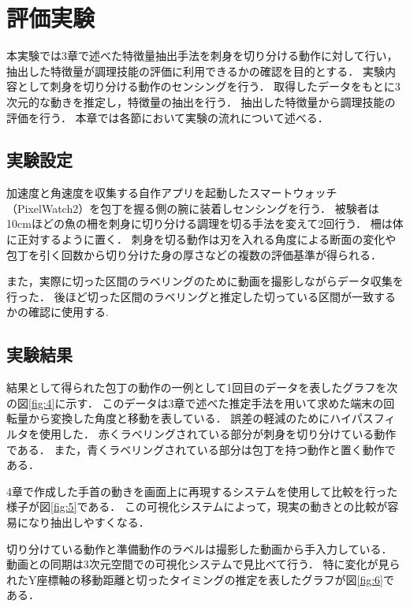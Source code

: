 \chapter{評価実験}
本実験では3章で述べた特徴量抽出手法を刺身を切り分ける動作に対して行い，抽出した特徴量が調理技能の評価に利用できるかの確認を目的とする．
実験内容として刺身を切り分ける動作のセンシングを行う．
取得したデータをもとに3次元的な動きを推定し，特徴量の抽出を行う．
抽出した特徴量から調理技能の評価を行う．
本章では各節において実験の流れについて述べる．
\section{実験設定}
加速度と角速度を収集する自作アプリを起動したスマートウォッチ（PixelWatch2）を包丁を握る側の腕に装着しセンシングを行う．
被験者は10cmほどの魚の柵を刺身に切り分ける調理を切る手法を変えて2回行う．
柵は体に正対するように置く．
刺身を切る動作は刃を入れる角度による断面の変化や包丁を引く回数から切り分けた身の厚さなどの複数の評価基準が得られる．

また，実際に切った区間のラベリングのために動画を撮影しながらデータ収集を行った．
後ほど切った区間のラベリングと推定した切っている区間が一致するかの確認に使用する.
\section{実験結果}
結果として得られた包丁の動作の一例として1回目のデータを表したグラフを次の図\ref{fig:4}に示す．
このデータは3章で述べた推定手法を用いて求めた端末の回転量から変換した角度と移動を表している．
誤差の軽減のためにハイパスフィルタを使用した．
赤くラベリングされている部分が刺身を切り分けている動作である．
また，青くラベリングされている部分は包丁を持つ動作と置く動作である．

4章で作成した手首の動きを画面上に再現するシステムを使用して比較を行った様子が図\ref{fig:5}である．
この可視化システムによって，現実の動きとの比較が容易になり抽出しやすくなる．

切り分けている動作と準備動作のラベルは撮影した動画から手入力している．
動画との同期は3次元空間での可視化システムで見比べて行う．
特に変化が見られたY座標軸の移動距離と切ったタイミングの推定を表したグラフが図\ref{fig:6}である．


